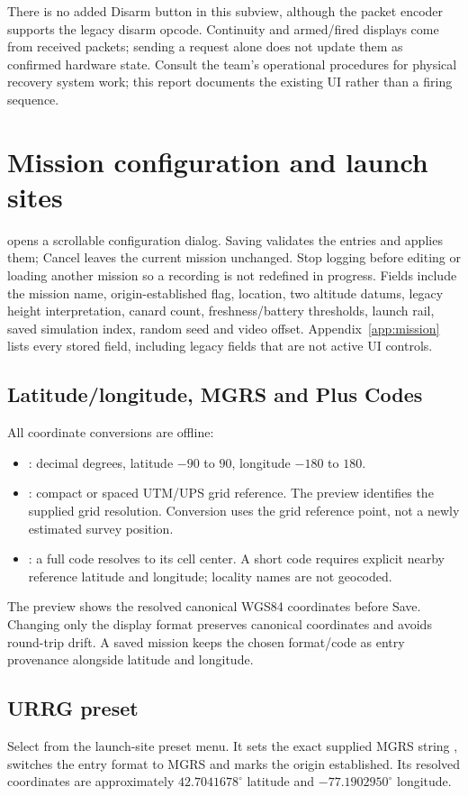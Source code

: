 There is no added Disarm button in this subview, although the packet encoder
supports the legacy disarm opcode. Continuity and armed/fired displays come from
received packets; sending a request alone does not update them as confirmed
hardware state. Consult the team's operational procedures for physical recovery
system work; this report documents the existing UI rather than a firing sequence.

\section{Mission configuration and launch sites}\label{sec:mission}
 opens a scrollable configuration dialog.
Saving validates the entries and applies them; Cancel leaves the current mission
unchanged. Stop logging before editing or loading another mission so a recording
is not redefined in progress. Fields include the mission name, origin-established
flag, location, two altitude datums, legacy height interpretation, canard count,
freshness/battery thresholds, launch rail, saved simulation index, random seed and
video offset. Appendix~\ref{app:mission} lists every stored field, including
legacy fields that are not active UI controls.

\subsection{Latitude/longitude, MGRS and Plus Codes}
All coordinate conversions are offline:
\begin{itemize}
\item {}: decimal degrees, latitude \(-90\) to \(90\),
longitude \(-180\) to \(180\).
\item {}: compact or spaced UTM/UPS grid reference. The preview identifies
the supplied grid resolution. Conversion uses the grid reference point, not a
newly estimated survey position.
\item {}: a full code resolves to its cell center. A short code
requires explicit nearby reference latitude and longitude; locality names are
not geocoded.
\end{itemize}
The preview shows the resolved canonical WGS84 coordinates before Save.
Changing only the display format preserves canonical coordinates and avoids
round-trip drift. A saved mission keeps the chosen format/code as entry
provenance alongside latitude and longitude.

\subsection{URRG preset}
Select  from the launch-site preset menu. It sets the exact supplied
MGRS string , switches the entry format to MGRS and marks the
origin established. Its resolved coordinates are approximately
\(42.7041678^\circ\) latitude and \(-77.1902950^\circ\) longitude.

